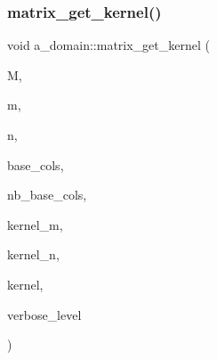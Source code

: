 \mbox{\label{classa__domain_af326b5da481fe0c204d0cf6bd0bc7376}} 
\subsubsection{\texorpdfstring{matrix\+\_\+get\+\_\+kernel()}{matrix\_get\_kernel()}}
{\footnotesize\ttfamily void a\+\_\+domain\+::matrix\+\_\+get\+\_\+kernel (\begin{DoxyParamCaption}\item[{\mbox{\hyperlink{galois_8h_a09fddde158a3a20bd2dcadb609de11dc}{I\+NT}} $\ast$}]{M,  }\item[{\mbox{\hyperlink{galois_8h_a09fddde158a3a20bd2dcadb609de11dc}{I\+NT}}}]{m,  }\item[{\mbox{\hyperlink{galois_8h_a09fddde158a3a20bd2dcadb609de11dc}{I\+NT}}}]{n,  }\item[{\mbox{\hyperlink{galois_8h_a09fddde158a3a20bd2dcadb609de11dc}{I\+NT}} $\ast$}]{base\+\_\+cols,  }\item[{\mbox{\hyperlink{galois_8h_a09fddde158a3a20bd2dcadb609de11dc}{I\+NT}}}]{nb\+\_\+base\+\_\+cols,  }\item[{\mbox{\hyperlink{galois_8h_a09fddde158a3a20bd2dcadb609de11dc}{I\+NT}} \&}]{kernel\+\_\+m,  }\item[{\mbox{\hyperlink{galois_8h_a09fddde158a3a20bd2dcadb609de11dc}{I\+NT}} \&}]{kernel\+\_\+n,  }\item[{\mbox{\hyperlink{galois_8h_a09fddde158a3a20bd2dcadb609de11dc}{I\+NT}} $\ast$}]{kernel,  }\item[{\mbox{\hyperlink{galois_8h_a09fddde158a3a20bd2dcadb609de11dc}{I\+NT}}}]{verbose\+\_\+level }\end{DoxyParamCaption})}

\mbox{\label{classa__domain_ad95d4cf04a39f7e6b330eb591d188c5d}} 
